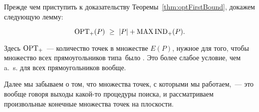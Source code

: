 Прежде чем приступить к доказательству Теоремы~\ref{thm:optFirstBound}, докажем следующую лемму:

\begin{lemma} \label{lm:optPlusBound}
\begin{equation}
	\label{eq:optPlusBound}
	\opt_+(P)\ \ge\ \abs{P} + \maxind_+ (P). %
\end{equation}
\end{lemma}

Здесь $\operatorname{OPT}_+$~--- количество точек в множестве $E(P)$, нужное для того, чтобы множество всех прямоугольников типа~\tpl было \arbs. Это более слабое условие, чем a.~s. для всех прямоугольников вообще.

Далее мы забываем о том, что множества точек, с которыми мы работаем,~--- это вообще говоря выходы какой-то процедуры поиска, и рассматриваем произвольные конечные множества точек на плоскости.

